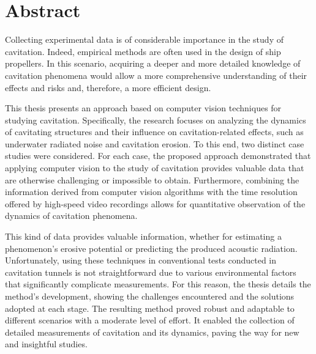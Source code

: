 \chapter{Abstract}
\label{chap:abstract}

Collecting experimental data is of considerable importance in the study of cavitation. Indeed, empirical methods are often used in the design of ship propellers.
In this scenario, acquiring a deeper and more detailed knowledge of cavitation phenomena would allow a more comprehensive understanding of their effects and risks and, therefore, a more efficient design.

This thesis presents an approach based on computer vision techniques for studying cavitation. 
Specifically, the research focuses on analyzing the dynamics of cavitating structures and their influence on cavitation-related effects, such as underwater radiated noise and cavitation erosion. To this end, two distinct case studies were considered.
For each case, the proposed approach demonstrated that applying computer vision to the study of cavitation provides valuable data that are otherwise challenging or impossible to obtain. Furthermore, combining the information derived from computer vision algorithms with the time resolution offered by high-speed video recordings allows for quantitative observation of the dynamics of cavitation phenomena.

This kind of data provides valuable information, whether for estimating a phenomenon's erosive potential or predicting the produced acoustic radiation. 
Unfortunately, using these techniques in conventional tests conducted in cavitation tunnels is not straightforward due to various environmental factors that significantly complicate measurements.
For this reason, the thesis details the method's development, showing the challenges encountered and the solutions adopted at each stage.
The resulting method proved robust and adaptable to different scenarios with a moderate level of effort. It enabled the collection of detailed measurements of cavitation and its dynamics, paving the way for new and insightful studies.



